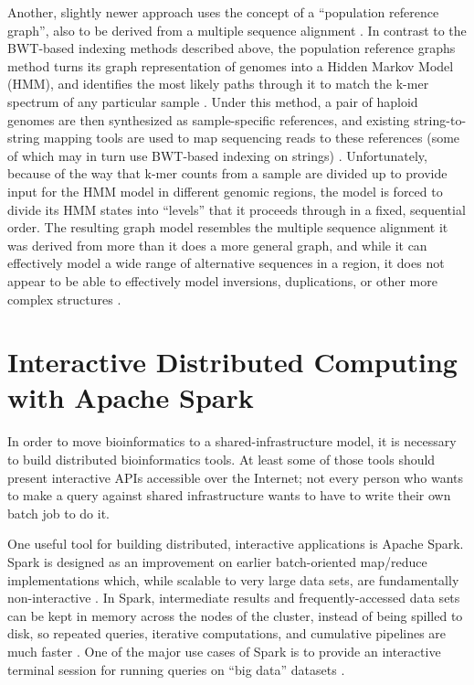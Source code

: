 \documentclass[11pt,proposal]{ucthesis}
\begin{document}
Another, slightly newer approach uses the concept of a ``population reference graph'', also to be derived from a multiple sequence alignment \cite{dilthey2014improved}. In contrast to the BWT-based indexing methods described above, the population reference graphs method turns its graph representation of genomes into a Hidden Markov Model (HMM), and identifies the most likely paths through it to match the k-mer spectrum of any particular sample \cite{dilthey2014improved}. Under this method, a pair of haploid genomes are then synthesized as sample-specific references, and existing string-to-string mapping tools are used to map sequencing reads to these references (some of which may in turn use BWT-based indexing on strings) \cite{dilthey2014improved}. Unfortunately, because of the way that k-mer counts from a sample are divided up to provide input for the HMM model in different genomic regions, the model is forced to divide its HMM states into ``levels'' that it proceeds through in a fixed, sequential order. The resulting graph model resembles the multiple sequence alignment it was derived from more than it does a more general graph, and while it can effectively model a wide range of alternative sequences in a region, it does not appear to be able to effectively model inversions, duplications, or other more complex structures \cite{dilthey2014improved}.
    



\section{Interactive Distributed Computing with Apache Spark}

In order to move bioinformatics to a shared-infrastructure model, it is necessary to build distributed bioinformatics tools. At least some of those tools should present interactive APIs accessible over the Internet; not every person who wants to make a query against shared infrastructure wants to have to write their own batch job to do it.

One useful tool for building distributed, interactive applications is Apache Spark. Spark is designed as an improvement on earlier batch-oriented map/reduce implementations which, while scalable to very large data sets, are fundamentally non-interactive \cite{zaharia2012fast,zaharia2012resilient}. In Spark, intermediate results and frequently-accessed data sets can be kept in memory across the nodes of the cluster, instead of being spilled to disk, so repeated queries, iterative computations, and cumulative pipelines are much faster \cite{zaharia2012fast,zaharia2012resilient}. One of the major use cases of Spark is to provide an interactive terminal session for running queries on ``big data'' datasets \cite{zaharia2012fast,apache2014interactive}.
\end{document}
